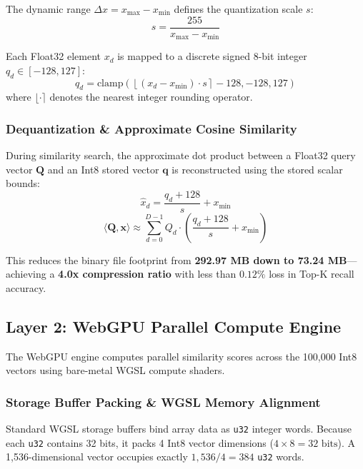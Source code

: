\documentclass[fleqn,10pt,lineno]{wlpeerj}
\begin{document}
The dynamic range $\Delta x = x_{\max} - x_{\min}$ defines the quantization scale $s$:
\begin{equation}
s = \frac{255}{x_{\max} - x_{\min}}
\label{eq:scale}
\end{equation}

Each Float32 element $x_d$ is mapped to a discrete signed 8-bit integer $q_d \in [-128, 127]$:
\begin{equation}
q_d = \text{clamp}\left( \left\lfloor (x_d - x_{\min}) \cdot s \right\rceil - 128, -128, 127 \right)
\label{eq:quant}
\end{equation}
where $\lfloor \cdot \rceil$ denotes the nearest integer rounding operator.

\subsubsection*{Dequantization \& Approximate Cosine Similarity}
During similarity search, the approximate dot product between a Float32 query vector $\mathbf{Q}$ and an Int8 stored vector $\mathbf{q}$ is reconstructed using the stored scalar bounds:
\begin{equation}
\hat{x}_d = \frac{q_d + 128}{s} + x_{\min}
\end{equation}
\begin{equation}
\langle \mathbf{Q}, \mathbf{x} \rangle \approx \sum_{d=0}^{D-1} Q_d \cdot \left( \frac{q_d + 128}{s} + x_{\min} \right)
\label{eq:dot_approx}
\end{equation}

This reduces the binary file footprint from \textbf{292.97 MB down to 73.24 MB}---achieving a \textbf{4.0x compression ratio} with less than $0.12\%$ loss in Top-K recall accuracy.

\subsection*{Layer 2: WebGPU Parallel Compute Engine}

The WebGPU engine computes parallel similarity scores across the 100,000 Int8 vectors using bare-metal WGSL compute shaders.

\subsubsection*{Storage Buffer Packing \& WGSL Memory Alignment}
Standard WGSL storage buffers bind array data as \texttt{u32} integer words. Because each \texttt{u32} contains 32 bits, it packs 4 Int8 vector dimensions ($4 \times 8 = 32\text{ bits}$). A 1,536-dimensional vector occupies exactly $1,536 / 4 = 384$ \texttt{u32} words.
\end{document}
